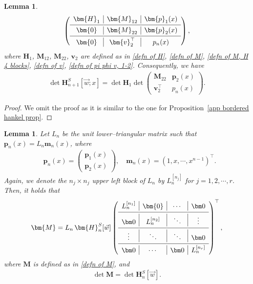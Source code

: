 \documentclass[a4paper,10pt,leqno]{amsart}
\numberwithin{equation}{section}
\newtheorem{lemma}[theorem]{Lemma}
\theoremstyle{remark}
\begin{document}
\begin{lemma}
\begin{align}
\begin{pmatrix}
    \begin{array}{c|c|c}
        \bm{H}_1 & \bm{M}_{12} & \bm{p}_1(x) \\
        \noalign{\vskip 2pt\hrule\vskip 2pt}
        \bm{0} & \bm{M}_{22} & \bm{p}_2(x) \\
        \noalign{\vskip 2pt\hrule\vskip 2pt}
        \bm{0} & \bm{v}_2^\top & p_n(x)
    \end{array}
\end{pmatrix},
\end{align}
where $\bm{H}_1$, $\bm{M}_{12}$, $\bm{M}_{22}$, $\bm{v}_2$ are defined as in \eqref{defn of H}, \eqref{defn of M}, \eqref{defn of M, H 4 blocks}, \eqref{defn of v}, \eqref{defn of pi phi v, 1-2}.
Consequently, we have
\begin{align} \label{det form 1}
\det \bm{H}^{S}_{n+1}[\vec{w}; x] = 
\det \bm{H}_1 \det \begin{pmatrix}
\bm{M}_{22}  & \bm{p}_2(x)  \\
\bm{v}_2^\top & p_n(x)
\end{pmatrix}.
\end{align}
\end{lemma}

\begin{proof}
We omit the proof as it is similar to the one for Proposition~\ref{app bordered hankel prop}.
\end{proof}

\begin{lemma}
Let $L_{n}$ be the unit lower–triangular matrix such that $\bm p_n (x) = L_{n} \bm m_{n} (x)$,
where 
\begin{align}
&\bm p_{n}(x) = \begin{pmatrix}
    \bm p_1(x)\\
    \bm p_2(x)
\end{pmatrix}, \quad 
\bm m_{n}(x) = \left( 1,x,\cdots,x^{n-1} \right)^\top.
\end{align}
Again, we denote the $n_j \times n_j$ upper left block of $L_n$ by $L_n^{[n_j]}$ for $j = 1, 2, \cdots, r$. Then, it holds that
\begin{equation}\label{eq:singleOP-factorization}
\bm{M} = L_{n} \, \bm{H}^{S}_{n}[\vec{w}] 
\begin{pmatrix} \begin{array}{c|c|c|c}
      L_{n}^{[n_1]} & \bm{0} & \cdots & \bm 0 \\
      \noalign{\vskip 2pt\hrule\vskip 2pt}
      \bm 0 & L_{n}^{[n_2]} & \ddots & \vdots \\
      \noalign{\vskip 2pt\hrule\vskip 2pt}
      \vdots & \ddots & \ddots & \bm 0 \\
      \noalign{\vskip 2pt\hrule\vskip 2pt}
      \bm 0 & \cdots & \bm 0 & L_{n}^{[n_r]}
    \end{array}
    \end{pmatrix}^\top,
\end{equation}
where $\bm{M}$ is defined as in \eqref{defn of M}, and
\begin{align} \label{det form 2}
\det\bm{M} = \det \bm{H}^{S}_{n}[\vec{w}].
\end{align}
\end{lemma}
\end{document}
